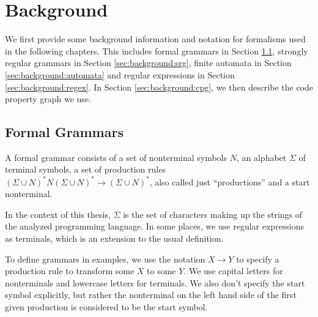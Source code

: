 \chapter{Background}
\label{chapter:Background}
\begin{comment}
What is the knowledge a undergrad student needs so that he/she can understand
your thesis? You can assume some familiarity with the very broad topic. E.g. if
you write a thesis in the area of software analysis, you do not have to explain
static/dynamic analysis as such (this is boring!). If you're a crypto guy, don't
explain AES in detail unless you try to break it in your thesis. If I stumble
across a word/term in your thesis and don't understand it, this is where I would
look it up (or on google).

Probably approx. 3-10 pages
\end{comment}

We first provide some background information and notation for formalisms used in the following chapters. This includes formal grammars in Section \ref{sec:background:grammars}, strongly regular grammars in Section \ref{sec:background:srg}, finite automata in Section \ref{sec:background:automata} and regular expressions in Section \ref{sec:background:regex}. In Section \ref{sec:background:cpg}, we then describe the code property graph we use.

\section{Formal Grammars}\label{sec:background:grammars}

A formal grammar consists of a set of nonterminal symbols $N$, an alphabet $\Sigma$ of terminal symbols, a set of production rules $(\Sigma \cup N)^*N(\Sigma \cup N)^* \rightarrow (\Sigma \cup N)^*$, also called just \enquote{productions} and a start nonterminal.

In the context of this thesis, $\Sigma$ is the set of characters making up the strings of the analyzed programming language. In some places, we use regular expressions as terminals, which is an extension to the usual definition.

To define grammars in examples, we use the notation $X \rightarrow Y$ to specify a production rule to transform some $X$ to some $Y$.
We use capital letters for nonterminals and lowercase letters for terminals. We also don't specify the start symbol explicitly, but rather the nonterminal on the left hand side of the first given production is considered to be the start symbol.

